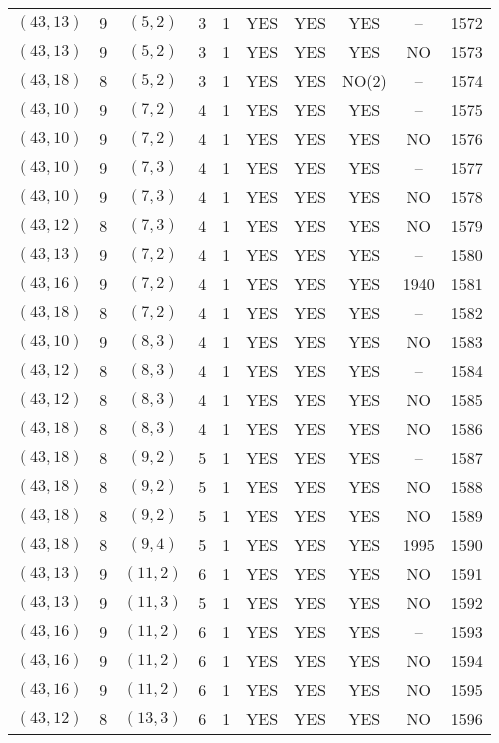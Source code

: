 \begin{longtable}{|c|c|c|c|c|c|c|c|c|c|}
$(43, 13)$ & 9 & $(5, 2)$ & 3 & 1 & YES & YES & YES & -- & 1572\\
$(43, 13)$ & 9 & $(5, 2)$ & 3 & 1 & YES & YES & YES & NO & 1573\\
$(43, 18)$ & 8 & $(5, 2)$ & 3 & 1 & YES & YES & NO(2) & -- & 1574\\
$(43, 10)$ & 9 & $(7, 2)$ & 4 & 1 & YES & YES & YES & -- & 1575\\
$(43, 10)$ & 9 & $(7, 2)$ & 4 & 1 & YES & YES & YES & NO & 1576\\
$(43, 10)$ & 9 & $(7, 3)$ & 4 & 1 & YES & YES & YES & -- & 1577\\
$(43, 10)$ & 9 & $(7, 3)$ & 4 & 1 & YES & YES & YES & NO & 1578\\
$(43, 12)$ & 8 & $(7, 3)$ & 4 & 1 & YES & YES & YES & NO & 1579\\
$(43, 13)$ & 9 & $(7, 2)$ & 4 & 1 & YES & YES & YES & -- & 1580\\
$(43, 16)$ & 9 & $(7, 2)$ & 4 & 1 & YES & YES & YES & 1940 & 1581\\
$(43, 18)$ & 8 & $(7, 2)$ & 4 & 1 & YES & YES & YES & -- & 1582\\
$(43, 10)$ & 9 & $(8, 3)$ & 4 & 1 & YES & YES & YES & NO & 1583\\
$(43, 12)$ & 8 & $(8, 3)$ & 4 & 1 & YES & YES & YES & -- & 1584\\
$(43, 12)$ & 8 & $(8, 3)$ & 4 & 1 & YES & YES & YES & NO & 1585\\
$(43, 18)$ & 8 & $(8, 3)$ & 4 & 1 & YES & YES & YES & NO & 1586\\
$(43, 18)$ & 8 & $(9, 2)$ & 5 & 1 & YES & YES & YES & -- & 1587\\
$(43, 18)$ & 8 & $(9, 2)$ & 5 & 1 & YES & YES & YES & NO & 1588\\
$(43, 18)$ & 8 & $(9, 2)$ & 5 & 1 & YES & YES & YES & NO & 1589\\
$(43, 18)$ & 8 & $(9, 4)$ & 5 & 1 & YES & YES & YES & 1995 & 1590\\
$(43, 13)$ & 9 & $(11, 2)$ & 6 & 1 & YES & YES & YES & NO & 1591\\
$(43, 13)$ & 9 & $(11, 3)$ & 5 & 1 & YES & YES & YES & NO & 1592\\
$(43, 16)$ & 9 & $(11, 2)$ & 6 & 1 & YES & YES & YES & -- & 1593\\
$(43, 16)$ & 9 & $(11, 2)$ & 6 & 1 & YES & YES & YES & NO & 1594\\
$(43, 16)$ & 9 & $(11, 2)$ & 6 & 1 & YES & YES & YES & NO & 1595\\
$(43, 12)$ & 8 & $(13, 3)$ & 6 & 1 & YES & YES & YES & NO & 1596\\

\end{longtable}
